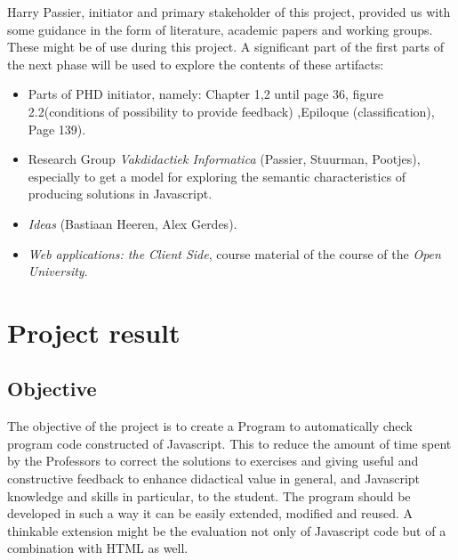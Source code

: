 \documentclass{article}
\begin{document}
Harry Passier, initiator and primary stakeholder of this project, provided us with some guidance in the form of literature, academic papers and working groups. These might be of use during this project. A significant part of the first parts of the next phase will be used to explore the contents of these artifacts:
\begin{itemize}
  \item Parts of PHD initiator, namely: Chapter 1,2 until page 36, figure 2.2(conditions of possibility to provide feedback) ,Epiloque (classification), Page 139).
  \item Research Group {\em Vakdidactiek Informatica} (Passier, Stuurman, Pootjes), especially to get a model for exploring the semantic characteristics of producing solutions in Javascript.
  \item {\em Ideas} (Bastiaan Heeren, Alex Gerdes).
  \item {\em Web applications: the Client Side}, course material of the course of the {\em Open University}.
\end{itemize}

\section{Project result}

\subsection{Objective}

The objective of the project is to create a Program to automatically check program code constructed of Javascript. This to reduce the amount of time spent by the Professors to correct the solutions to exercises and giving useful and constructive feedback to enhance didactical value in general, and Javascript knowledge and skills in particular, to the student. The program should be developed in such a way it can be easily extended, modified and reused. A thinkable extension might be the evaluation not only of Javascript code but of a combination with HTML as well. 
\end{document}
